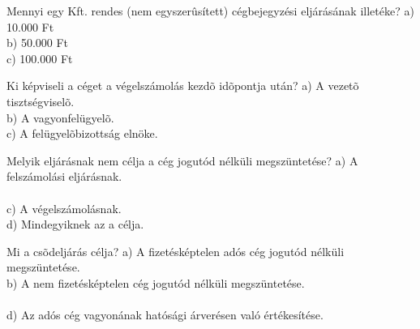 \begin{frame}

\begin{tcolorbox}[title={102. Kérdés}]
Mennyi egy Kft. rendes (nem egyszerûsített) cégbejegyzési eljárásának illetéke?
\tcblower
a) 10.000 Ft\\
b) 50.000 Ft\\
c) 100.000 Ft\\
\end{tcolorbox}

\begin{tcolorbox}[title={103. Kérdés}]
Ki képviseli a céget a végelszámolás kezdõ idõpontja után?
\tcblower
a) A vezetõ tisztségviselõ.\\
b) A vagyonfelügyelõ.\\
c) A felügyelõbizottság elnöke.\\
\end{tcolorbox}

\begin{tcolorbox}[title={104. Kérdés}]
Melyik eljárásnak nem célja a cég jogutód nélküli megszüntetése?
\tcblower
a) A felszámolási eljárásnak.\\
\\
c) A végelszámolásnak.\\
d) Mindegyiknek az a célja.
\end{tcolorbox}

\begin{tcolorbox}[title={105. Kérdés}]
Mi a csõdeljárás célja?
\tcblower
a) A fizetésképtelen adós cég jogutód nélküli megszüntetése.\\
b) A nem fizetésképtelen cég jogutód nélküli megszüntetése.\\
\\
d) Az adós cég vagyonának hatósági árverésen való értékesítése.
\end{tcolorbox}

\end{frame}


